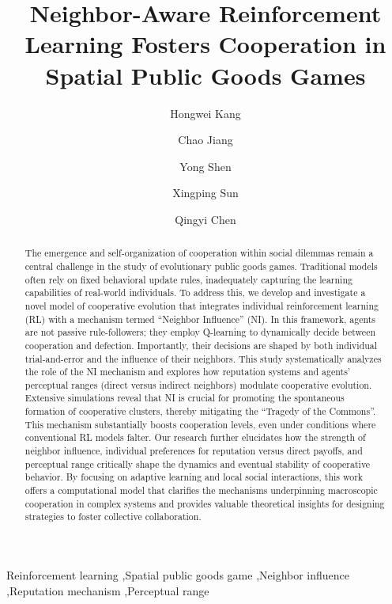 \documentclass[preprint,number,sort&compress,12pt]{elsarticle}
\begin{document}
\begin{frontmatter}


\title{Neighbor-Aware Reinforcement Learning Fosters Cooperation in Spatial Public Goods Games}


\author{Hongwei Kang}

\author{Chao Jiang}
\author{Yong Shen}
\author{Xingping Sun}
\author{Qingyi Chen}



\address{School of Software, Yunnan University, Kunming, 650000, Yunnan, China}


\begin{abstract}
The emergence and self-organization of cooperation within social dilemmas remain a central challenge in the study of evolutionary public goods games. Traditional models often rely on fixed behavioral update rules, inadequately capturing the learning capabilities of real-world individuals. To address this, we develop and investigate a novel model of cooperative evolution that integrates individual reinforcement learning (RL) with a mechanism termed ``Neighbor Influence'' (NI). In this framework, agents are not passive rule-followers; they employ Q-learning to dynamically decide between cooperation and defection. Importantly, their decisions are shaped by both individual trial-and-error and the influence of their neighbors. This study systematically analyzes the role of the NI mechanism and explores how reputation systems and agents' perceptual ranges (direct versus indirect neighbors) modulate cooperative evolution. Extensive simulations reveal that NI is crucial for promoting the spontaneous formation of cooperative clusters, thereby mitigating the ``Tragedy of the Commons''. This mechanism substantially boosts cooperation levels, even under conditions where conventional RL models falter. Our research further elucidates how the strength of neighbor influence, individual preferences for reputation versus direct payoffs, and perceptual range critically shape the dynamics and eventual stability of cooperative behavior. By focusing on adaptive learning and local social interactions, this work offers a computational model that clarifies the mechanisms underpinning macroscopic cooperation in complex systems and provides valuable theoretical insights for designing strategies to foster collective collaboration.
\end{abstract}


\begin{keyword}
Reinforcement learning \sep Spatial public goods game \sep Neighbor influence \sep Reputation mechanism \sep Perceptual range
\end{keyword}

\end{frontmatter}
\end{document}
